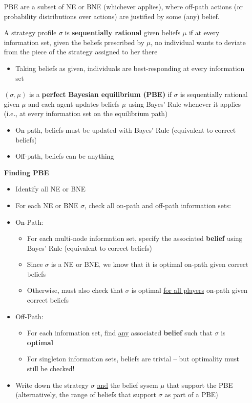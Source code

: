 \documentclass{report}
\newcommand{\FlowerSmall}{\mbox{\raisebox{-1pt}{\small\EightFlowerPetalRemoved}}} %
\begin{document}
PBE are a subset of NE or BNE (whichever applies), where off-path actions (or probability distributions over actions) are justified by some (any) belief. \bigskip

A strategy profile $\sigma$ is \textbf{sequentially rational} given beliefs $\mu$ if at every information set, given the beliefs prescribed by $\mu$, no individual wants to deviate from the piece of the strategy assigned to her there
\begin{itemize}
	\item Taking beliefs as given, individuals are best-responding at every information set
\end{itemize} \bigskip

$(\sigma,\mu)$ is a \textbf{perfect Bayesian equilibrium (PBE)} if $\sigma$ is sequentially rational given $\mu$ and each agent updates beliefs $\mu$ using Bayes' Rule whenever it applies (i.e., at every information set on the equilibrium path)
\begin{itemize}
	\item On-path, beliefs must be updated with Bayes' Rule (equivalent to correct beliefs)
	\item Off-path, beliefs can be anything
\end{itemize}

\newpage
\begin{mdframed}
	\medskip
	\begin{center} \textbf{{\large Finding PBE}} \end{center}
	\begin{itemize}[label=\FlowerSmall]
		\item Identify all NE or BNE
		\item For each NE or BNE $\sigma$, check all on-path and off-path information sets:
		\item On-Path:
			\begin{itemize}
				\item For each multi-node information set, specify the associated \textbf{belief} using Bayes' Rule (equivalent to correct beliefs)
				\item Since $\sigma$ is a NE or BNE, we know that it is optimal on-path given correct beliefs
				\item Otherwise, must also check that $\sigma$ is optimal  \underline{for all players} on-path given correct beliefs 
			\end{itemize}
		\item Off-Path:
			\begin{itemize}
				\item For each information set, find \underline{any} associated \textbf{belief} such that $\sigma$ is \textbf{optimal}
				\item For singleton information sets, beliefs are trivial -- but optimality must still be checked!
			\end{itemize}
		\item Write down the strategy $\sigma$ \underline{and} the belief sysem $\mu$ that support the PBE\\ (alternatively, the range of beliefs that support $\sigma$ as part of a PBE)
	\end{itemize}
	\smallskip
\end{mdframed}
\bigskip
\end{document}
